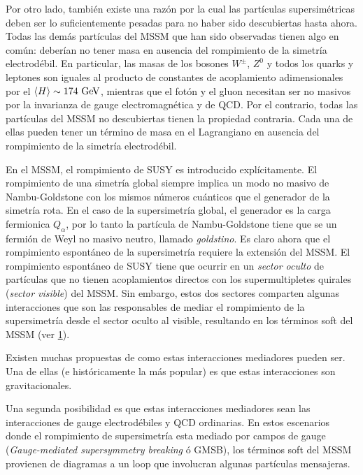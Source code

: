 Por otro lado, también existe una razón por la cual las partículas
supersimétricas deben ser lo suficientemente pesadas para no haber sido
descubiertas hasta ahora. Todas las demás partículas del MSSM que han sido
observadas tienen algo en común: deberían no tener masa en ausencia del
rompimiento de la simetría electrodébil. En particular, las masas de los
bosones $W^\pm$, $Z^0$ y todos los quarks y leptones son iguales al producto de
constantes de acoplamiento adimensionales por el $\avg{H} \sim 174 \gev$,
mientras que el fotón y el gluon necesitan ser no masivos por la invarianza de
gauge electromagnética y de QCD. Por el contrario, todas las partículas del MSSM
no descubiertas tienen la propiedad contraria. Cada una de ellas pueden tener un
término de masa en el Lagrangiano en ausencia del rompimiento de la simetría
electrodébil.

En el MSSM, el rompimiento de SUSY es introducido explícitamente. El rompimiento
de una simetría global siempre implica un modo no masivo de Nambu-Goldstone con
los mismos números cuánticos que el generador de la simetría rota. En el caso de
la supersimetría global, el generador es la carga fermionica $Q_\alpha$, por lo
tanto la partícula de Nambu-Goldstone tiene que se un fermión de Weyl no masivo
neutro, llamado \emph{goldstino}. Es claro ahora que el rompimiento espontáneo
de la supersimetría requiere la extensión del MSSM. El rompimiento espontáneo de
SUSY tiene que ocurrir en un \emph{sector oculto} de partículas que no tienen
acoplamientos directos con los supermultipletes quirales (\emph{sector visible})
del MSSM. Sin embargo, estos dos sectores comparten algunas interacciones que
son las responsables de mediar el rompimiento de la supersimetría desde el
sector oculto al visible, resultando en los términos soft del MSSM (ver
\cref{fig:susy_breaking}).

\begin{figure}[!htbp]
  \centering
  
  \caption{}\label{fig:susy_breaking}
\end{figure}

Existen muchas propuestas de como estas interacciones mediadores pueden ser. Una
de ellas (e históricamente la más popular) es que estas interacciones son
gravitacionales.

Una segunda posibilidad es que estas interacciones mediadores sean las
interacciones de gauge electrodébiles y QCD ordinarias. En estos escenarios
donde el rompimiento de supersimetría esta mediado por campos de gauge
(\emph{Gauge-mediated supersymmetry breaking} ó GMSB), los términos soft del
MSSM provienen de diagramas a un loop que involucran algunas partículas
mensajeras.

